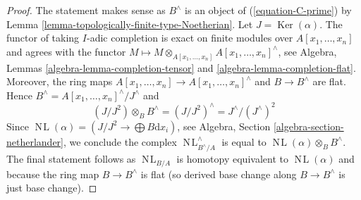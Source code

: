 \documentclass[10pt,a4paper]{amsart}
\theoremstyle{plain}
\theoremstyle{definition}
\theoremstyle{remark}
\numberwithin{equation}{subsection}
\def\NL{\mathop{N\!L}\nolimits}
\def\Ker{\mathop{\mathrm{Ker}}}
\begin{document}
\begin{proof}
The statement makes sense as $B^\wedge$ is an object of
(\ref{equation-C-prime}) by
Lemma \ref{lemma-topologically-finite-type-Noetherian}.
Let $J = \Ker(\alpha)$. The functor of taking
$I$-adic completion is exact on finite modules over
$A[x_1, \ldots, x_n]$ and agrees with the functor
$M \mapsto M \otimes_{A[x_1, \ldots, x_n]} A[x_1, \ldots, x_n]^\wedge$, see
Algebra, Lemmas \ref{algebra-lemma-completion-tensor} and
\ref{algebra-lemma-completion-flat}. Moreover, the ring maps
$A[x_1, \ldots, x_n] \to A[x_1, \ldots, x_n]^\wedge$
and $B \to B^\wedge$ are flat. Hence
$B^\wedge = A[x_1, \ldots, x_n]^\wedge / J^\wedge$ and
$$
(J/J^2) \otimes_B B^\wedge = (J/J^2)^\wedge = J^\wedge/(J^\wedge)^2
$$
Since $\NL(\alpha) = (J/J^2 \to \bigoplus B\text{d}x_i)$,
see Algebra, Section \ref{algebra-section-netherlander},
we conclude the complex $\NL_{B^\wedge/A}^\wedge$ is equal
to $\NL(\alpha) \otimes_B B^\wedge$. The final statement
follows as $\NL_{B/A}$ is homotopy equivalent to $\NL(\alpha)$
and because the ring map $B \to B^\wedge$ is flat (so derived
base change along $B \to B^\wedge$ is just base change).
\end{proof}
\end{document}
